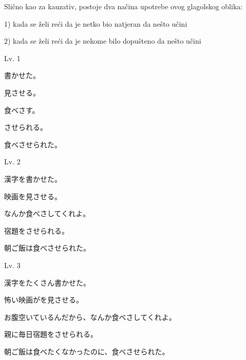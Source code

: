 
	Slično kao za kauzativ, postoje dva načina upotrebe ovog glagolskog oblika:
	
	1) kada se želi reći da je netko bio natjeran da nešto učini
	
	2) kada se želi reći da je nekome bilo dopušteno da nešto učini
 
	\begin{reibun}
	\end{reibun}

	\newpage		
		
	\begin{mondai}{Lv. 1}
		\item 書かせた。
		\item 見させる。
		\item 食べさす。
		\item させられる。
		\item 食べさせられた。
	\end{mondai}
		
	\begin{mondai}{Lv. 2}
		\item 漢字を書かせた。
		\item 映画を見させる。
		\item なんか食べさしてくれよ。
		\item 宿題をさせられる。
		\item 朝ご飯は食べさせられた。
	\end{mondai}
	
	\begin{mondai}{Lv. 3}
		\item 漢字をたくさん書かせた。
		\item 怖い映画がを見させる。
		\item お腹空いているんだから、なんか食べさしてくれよ。
		\item 親に毎日宿題をさせられる。
		\item 朝ご飯は食べたくなかったのに、食べさせられた。
	\end{mondai}
	

